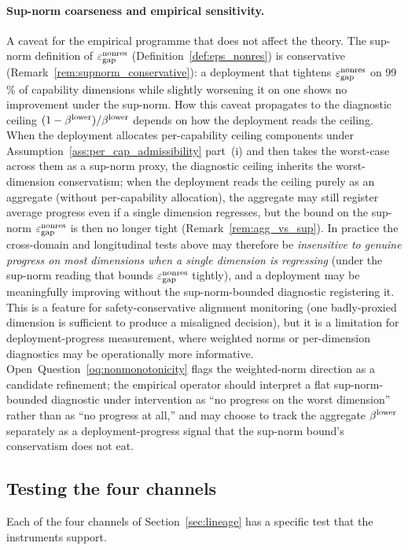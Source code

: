 \paragraph{Sup-norm coarseness and empirical sensitivity.}
A caveat for the empirical programme that does not affect the
theory.  The sup-norm definition of $\varepsilon_{\mathrm{gap}}^{\mathrm{nonres}}$
(Definition~\ref{def:eps_nonres}) is conservative
(Remark~\ref{rem:supnorm_conservative}): a deployment that
tightens $\varepsilon_{\mathrm{gap}}^{\mathrm{nonres}}$ on 99\,\% of capability dimensions while
slightly worsening it on one shows no improvement under the
sup-norm.  How this caveat propagates to the diagnostic
ceiling $(1-\beta^{\mathrm{lower}})/\beta^{\mathrm{lower}}$ depends on how the deployment
reads the ceiling.  When the deployment allocates per-capability
ceiling components under
Assumption~\ref{ass:per_cap_admissibility} part~(i) and then
takes the worst-case across them as a sup-norm proxy, the
diagnostic ceiling inherits the worst-dimension conservatism;
when the deployment reads the ceiling purely as an aggregate
(without per-capability allocation), the aggregate may still
register average progress even if a single dimension regresses,
but the bound on the sup-norm $\varepsilon_{\mathrm{gap}}^{\mathrm{nonres}}$ is then no longer
tight (Remark~\ref{rem:agg_vs_sup}).  In practice the
cross-domain and longitudinal tests above may therefore be
\emph{insensitive to genuine progress on most dimensions when a
single dimension is regressing} (under the sup-norm reading
that bounds $\varepsilon_{\mathrm{gap}}^{\mathrm{nonres}}$ tightly), and a deployment may be
meaningfully improving without the sup-norm-bounded diagnostic
registering it.  This is a feature for safety-conservative
alignment monitoring (one badly-proxied dimension is
sufficient to produce a misaligned decision), but it is a
limitation for deployment-progress measurement, where weighted
norms or per-dimension diagnostics may be operationally more
informative.  Open~Question~\ref{oq:nonmonotonicity} flags the
weighted-norm direction as a candidate refinement; the
empirical operator should interpret a flat sup-norm-bounded
diagnostic under intervention as ``no progress on the worst
dimension'' rather than as ``no progress at all,'' and may
choose to track the aggregate $\beta^{\mathrm{lower}}$ separately as a
deployment-progress signal that the sup-norm bound's
conservatism does not eat.

\subsection{Testing the four channels}
\label{sec:testing_channels}

Each of the four channels of Section~\ref{sec:lineage} has a
specific test that the instruments support.

